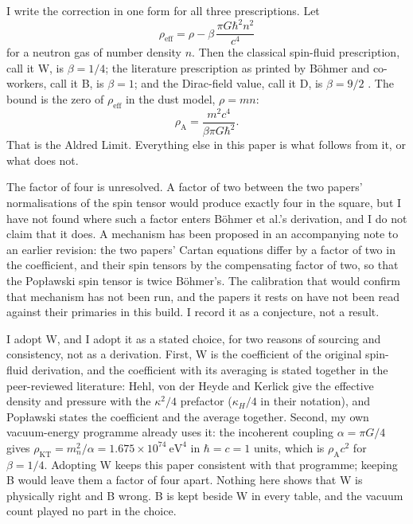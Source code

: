\documentclass[11pt]{article}
\newcommand{\rhoA}{\rho_{\mathrm{A}}}
\begin{document}
I write the correction in one form for all three prescriptions. Let
\begin{equation}
\rho_{\mathrm{eff}} = \rho - \beta\,\frac{\pi G\hbar^2 n^2}{c^4}
\end{equation}
for a neutron gas of number density $n$. Then the classical spin-fluid
prescription, call it W, is $\beta = 1/4$; the literature prescription
as printed by B\"ohmer and co-workers, call it B, is $\beta = 1$; and
the Dirac-field value, call it D, is $\beta = 9/2$
\cite{Poplawski12}. The bound is the zero of
$\rho_{\mathrm{eff}}$ in the dust model, $\rho = mn$:
\begin{equation}
\rhoA = \frac{m^2 c^4}{\beta\pi G\hbar^2}.
\end{equation}
That is the Aldred Limit. Everything else in this paper is what follows
from it, or what does not.

The factor of four is unresolved. A factor of two between the two
papers' normalisations of the spin tensor would produce exactly four in
the square, but I have not found where such a factor enters B\"ohmer et
al.'s derivation, and I do not claim that it does. A mechanism has been
proposed in an accompanying note to an earlier revision: the two papers'
Cartan equations differ by a factor of two in the coefficient, and their
spin tensors by the compensating factor of two, so that the Pop{\l}awski
spin tensor is twice B\"ohmer's. The calibration that would confirm that
mechanism has not been run, and the papers it rests on have not been read
against their primaries in this build. I record it as a conjecture, not
a result.

I adopt W, and I adopt it as a stated choice, for two reasons of
sourcing and consistency, not as a derivation. First, W is the
coefficient of the original spin-fluid derivation, and the coefficient
with its averaging is stated together in the peer-reviewed literature:
Hehl, von der Heyde and Kerlick give the effective density and pressure
with the $\kappa^2/4$ prefactor ($\kappa_H/4$ in their notation), and Pop{\l}awski states the coefficient
and the average together. Second, my own vacuum-energy programme already
uses it: the incoherent coupling $\alpha = \pi G/4$ gives
$\rho_{\mathrm{KT}} = m_n^2/\alpha = 1.675\times10^{74}\ \mathrm{eV}^4$
in $\hbar = c = 1$ units, which is $\rhoA c^2$ for $\beta = 1/4$. Adopting W keeps this paper
consistent with that programme; keeping B would leave them a factor of
four apart. Nothing here shows that W is physically right and B wrong.
B is kept beside W in every table, and the vacuum count played no part
in the choice.
\end{document}

